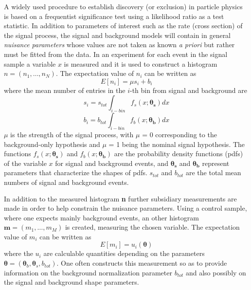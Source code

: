 \documentclass[a4paper, oneside, 11pt, openright]{book}
\begin{document}
 			A widely used procedure to establish discovery (or exclusion) in particle physics is based on a frequentist significance test using a likelihood ratio as a test statistic. In addition to parameters of interest such as the rate (cross section) of the signal process, the signal and background models will contain in general \textit{nuisance parameters} whose values are not taken as known \textit{a priori} but rather must be fitted from the data. In an experiment for each event in the signal sample a variable $x$ is measured and it is used to construct a histogram $n = (n_1,\dots, n_N)$. The expectation value of $n_i$ can be written as
 			\begin{equation}
 				E[n_i] = \mu s_i + b_i
 			\end{equation}
 			where the mean number of entries in the $i$-th bin from signal and background are
 			\begin{equation}
 				s_i = s_{tot} \int_{i-bin} f_s(x;\boldsymbol{\theta_s}) dx
 			\end{equation}
 			\begin{equation}
 				b_i = b_{tot} \int_{i-bin} f_b(x;\boldsymbol{\theta_b}) dx
 			\end{equation}
 			$\mu$ is the strength of the signal process, with $\mu$ = 0 corresponding to the background-only hypothesis and $\mu$ = 1 being the nominal signal hypothesis. The functions $f_s(x;\boldsymbol{\theta_s})$ and $f_b(x;\boldsymbol{\theta_b})$ are the probability density functions (pdfs) of the variable $x$ for signal and background events, and $\boldsymbol{\theta_s}$ and $\boldsymbol{\theta_b}$ represent parameters that characterize the shapes of pdfs. $s_{tot}$ and $b_{tot}$ are the total mean numbers of signal and background events. %
 			
 			In addition to the measured histogram \textbf{n} further subsidiary measurements are made in order to help constrain the nuisance parameters. Using a control sample, where one expects mainly background events, an other histogram $\textbf{m} = (m_1,\dots,m_M)$ is created, measuring the chosen variable. The expectation value of $m_i$ can be written as
 			\begin{equation}
 				E[m_i] = u_i(\boldsymbol{\theta})  
 			\end{equation}
 			where the $u_i$ are calculable quantities depending on the parameters $\boldsymbol{\theta} = (\boldsymbol{\theta}_b,\boldsymbol{\theta}_s,b_{tot})$. One often constructs this measurement so as to provide information on the background normalization parameter $b_{tot}$ and also possibly on the signal and background shape parameters.
 			
\end{document}
